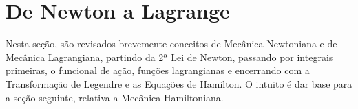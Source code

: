 \section{De Newton a Lagrange}

Nesta seção, são revisados brevemente conceitos de Mecânica Newtoniana e de Mecânica Lagrangiana, partindo da 2ª Lei de Newton, passando por integrais primeiras, o funcional de ação, funções lagrangianas e encerrando com a Transformação de Legendre e as Equações de Hamilton. O intuito é dar base para a seção seguinte, relativa a Mecânica Hamiltoniana.





